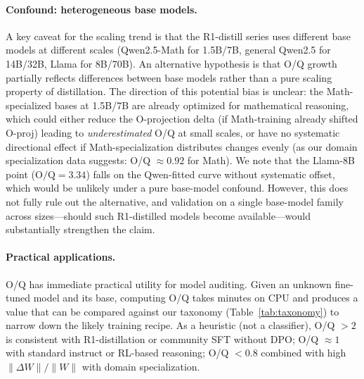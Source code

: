 \documentclass[11pt]{article}
\newcommand{\oq}{\text{O/Q}}
\newcommand{\dwnorm}{\|\Delta W\|/\|W\|}
\begin{document}
\paragraph{Confound: heterogeneous base models.}
A key caveat for the scaling trend is that the R1-distill series uses different
base models at different scales (Qwen2.5-Math for 1.5B/7B, general Qwen2.5 for
14B/32B, Llama for 8B/70B).
An alternative hypothesis is that O/Q growth partially reflects differences
between base models rather than a pure scaling property of distillation.
The direction of this potential bias is unclear: the Math-specialized bases at
1.5B/7B are already optimized for mathematical reasoning, which could either
reduce the O-projection delta (if Math-training already shifted O-proj) leading
to \emph{underestimated} O/Q at small scales, or have no systematic directional
effect if Math-specialization distributes changes evenly (as our domain
specialization data suggests: O/Q $\approx 0.92$ for Math).
We note that the Llama-8B point ($\oq = 3.34$) falls on the Qwen-fitted curve
without systematic offset, which would be unlikely under a pure base-model
confound.
However, this does not fully rule out the alternative, and validation on a
single base-model family across sizes---should such R1-distilled models become
available---would substantially strengthen the claim.

\paragraph{Practical applications.}
O/Q has immediate practical utility for model auditing.
Given an unknown fine-tuned model and its base, computing O/Q takes minutes on
CPU and produces a value that can be compared against our taxonomy
(Table~\ref{tab:taxonomy}) to narrow down the likely training recipe.
As a heuristic (not a classifier), O/Q $> 2$ is consistent with R1-distillation
or community SFT without DPO; O/Q $\approx 1$ with standard instruct or
RL-based reasoning; O/Q $< 0.8$ combined with high $\dwnorm$ with domain
specialization.
\end{document}
